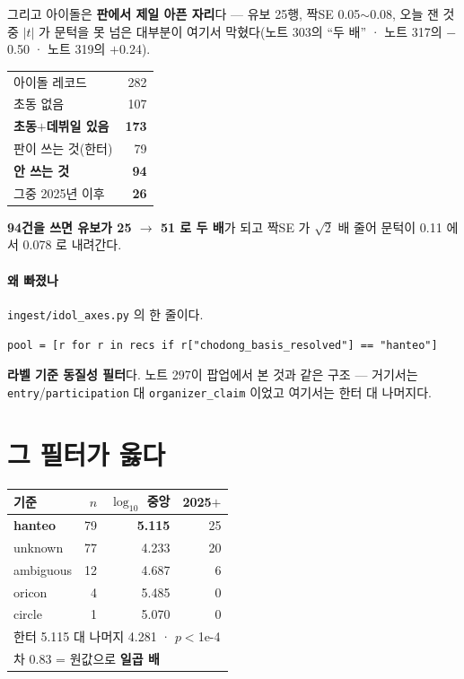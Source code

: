 \documentclass[10pt]{article}
\begin{document}
그리고 아이돌은 \textbf{판에서 제일 아픈 자리}다 --- 유보 25행, 짝SE
0.05$\sim$0.08, 오늘 잰 것 중 $|t|$ 가 문턱을 못 넘은 대부분이 여기서
막혔다(노트 303의 ``두 배'' · 노트 317의 $-$0.50 · 노트 319의 $+$0.24).

\begin{center}\footnotesize
\begin{tabular}{lr}
\hline
아이돌 레코드 & 282 \\
\quad 초동 없음 & 107 \\
\quad \textbf{초동$+$데뷔일 있음} & \textbf{173} \\
\quad\quad 판이 쓰는 것(한터) & 79 \\
\quad\quad \textbf{안 쓰는 것} & \textbf{94} \\
\quad\quad\quad 그중 2025년 이후 & \textbf{26} \\
\hline
\end{tabular}
\end{center}

\textbf{94건을 쓰면 유보가 25 $\to$ 51 로 두 배}가 되고 짝SE 가 $\sqrt2$ 배
줄어 문턱이 0.11 에서 0.078 로 내려간다.

\paragraph{왜 빠졌나} \texttt{ingest/idol\_axes.py} 의 한 줄이다.

\begin{center}\small
\texttt{pool = [r for r in recs if r["chodong\_basis\_resolved"] == "hanteo"]}
\end{center}

\textbf{라벨 기준 동질성 필터}다. 노트 297이 팝업에서 본 것과 같은 구조 ---
거기서는 \texttt{entry}/\texttt{participation} 대 \texttt{organizer\_claim}
이었고 여기서는 한터 대 나머지다.

\section{그 필터가 옳다}

\begin{center}\small
\begin{tabular}{lrrr}
\hline
기준 & $n$ & $\log_{10}$ 중앙 & 2025$+$ \\
\hline
\textbf{hanteo} & 79 & \textbf{5.115} & 25 \\
unknown & 77 & 4.233 & 20 \\
ambiguous & 12 & 4.687 & 6 \\
oricon & 4 & 5.485 & 0 \\
circle & 1 & 5.070 & 0 \\
\hline
\multicolumn{4}{l}{한터 5.115 대 나머지 4.281 · $p{<}$1e-4} \\
\multicolumn{4}{l}{차 0.83 = 원값으로 \textbf{일곱 배}} \\
\hline
\end{tabular}
\end{center}
\end{document}
